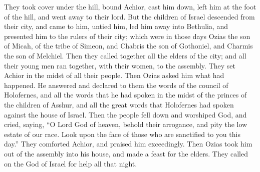 {They took cover under the hill, bound Achior, cast him down, left him at the foot of the hill, and went away to their lord.
But the children of Israel descended from their city, and came to him, untied him, led him away into Bethulia, and presented him to the rulers of their city;
which were in those days Ozias the son of Micah, of the tribe of Simeon, and Chabris the son of Gothoniel, and Charmis the son of Melchiel.
Then they called together all the elders of the city; and all their young men ran together, with their women, to the assembly. They set Achior in the midst of all their people. Then Ozias asked him what had happened.
He answered and declared to them the words of the council of Holofernes, and all the words that he had spoken in the midst of the princes of the children of Asshur, and all the great words that Holofernes had spoken against the house of Israel.
Then the people fell down and worshiped God, and cried, saying,
“O Lord God of heaven, behold their arrogance, and pity the low estate of our race. Look upon the face of those who are sanctified to you this day.”
They comforted Achior, and praised him exceedingly.
Then Ozias took him out of the assembly into his house, and made a feast for the elders. They called on the God of Israel for help all that night.

}
